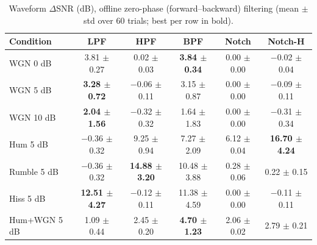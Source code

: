 \begin{table}[!t]
\caption{Waveform $\Delta$SNR (dB), offline zero-phase (forward--backward) filtering (mean $\pm$ std over 60 trials; best per row in bold).}
\label{tab:dsnr_zp}
\centering\footnotesize
\begin{tabular}{lccccc}
\hline
Condition & LPF & HPF & BPF & Notch & Notch-H \\ \hline
WGN 0 dB & 3.81 $\pm$ 0.27 & 0.02 $\pm$ 0.03 & \textbf{3.84 $\pm$ 0.34} & 0.00 $\pm$ 0.00 & $-$0.02 $\pm$ 0.04 \\
WGN 5 dB & \textbf{3.28 $\pm$ 0.72} & $-$0.06 $\pm$ 0.11 & 3.15 $\pm$ 0.87 & 0.00 $\pm$ 0.00 & $-$0.09 $\pm$ 0.11 \\
WGN 10 dB & \textbf{2.04 $\pm$ 1.56} & $-$0.32 $\pm$ 0.32 & 1.64 $\pm$ 1.83 & 0.00 $\pm$ 0.00 & $-$0.31 $\pm$ 0.34 \\
Hum 5 dB & $-$0.36 $\pm$ 0.32 & 9.25 $\pm$ 0.94 & 7.27 $\pm$ 2.09 & 6.12 $\pm$ 0.04 & \textbf{16.70 $\pm$ 4.24} \\
Rumble 5 dB & $-$0.36 $\pm$ 0.32 & \textbf{14.88 $\pm$ 3.20} & 10.48 $\pm$ 3.88 & 0.28 $\pm$ 0.06 & 0.22 $\pm$ 0.15 \\
Hiss 5 dB & \textbf{12.51 $\pm$ 4.27} & $-$0.12 $\pm$ 0.11 & 11.38 $\pm$ 4.59 & 0.00 $\pm$ 0.00 & $-$0.11 $\pm$ 0.11 \\
Hum+WGN 5 dB & 1.09 $\pm$ 0.44 & 2.45 $\pm$ 0.20 & \textbf{4.70 $\pm$ 1.23} & 2.06 $\pm$ 0.02 & 2.79 $\pm$ 0.21 \\
\hline
\end{tabular}

\end{table}